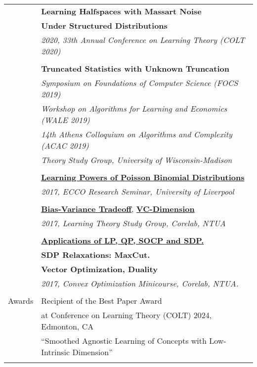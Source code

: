 \documentclass[letterpaper,11pt,oneside]{article}
\begin{document}
\begin{longtable}{@{} l l}
     &\textbf{Learning Halfspaces with Massart Noise}\\
     &\textbf{Under Structured Distributions}\\
     & \emph{2020, 33th Annual Conference on Learning Theory (COLT 2020) } \\
     & \\

 &\textbf{Truncated Statistics with Unknown Truncation}\\
 &\emph{Symposium on Foundations of Computer Science (FOCS 2019)}\\
 &\emph{Workshop on Algorithms for Learning and Economics (WALE 2019)}\\
 &\emph{14th Athens Colloquium on Algorithms and Complexity (ACAC 2019)}\\
 &\emph{Theory Study Group, University of Wisconsin-Madison}\\
 &\\

 &\href{https://vkonton.github.io/assets/talks/pbdPowers.pdf}
 {\textbf{Learning Powers of Poisson Binomial Distributions}}\\
 &\emph{2017, ECCO Research Seminar, University of Liverpool} \\
&\\

  &\href{https://vkonton.github.io/assets/talks/learning1.pdf}{\textbf{Bias-Variance Tradeoff}},
  \href{https://vkonton.github.io/assets/talks/learning2.pdf}{\textbf{VC-Dimension}}\\
  &\emph{2017, Learning Theory Study Group, Corelab, NTUA}\\
  &\\

  &\href{https://vkonton.github.io/talks/}{\textbf{Applications of LP, QP, SOCP and SDP.}}\\
  &\textbf{SDP Relaxations: MaxCut.}\\
  &\textbf{Vector Optimization, Duality} \\
  &\emph{2017, Convex Optimization Minicourse, Corelab, NTUA.}\\
  &\\



 \Large{Awards}
 & Recipient of the Best Paper Award \\ 
 & at Conference on Learning Theory (COLT) 2024, Edmonton, CA \\ 
 & ``Smoothed Agnostic Learning of Concepts with Low-Intrinsic Dimension''\\
 & \\


\end{longtable}
\end{document}
